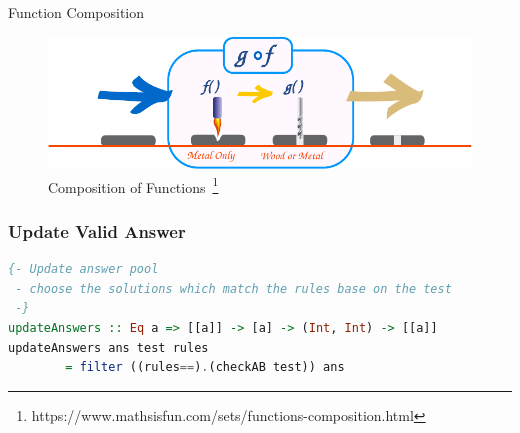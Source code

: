 \documentclass[10pt]{beamer}
\begin{document}
\begin{frame}{Function Composition}
  \begin{figure}
  \includegraphics[width=\textwidth,keepaspectratio] {function-composition-c.pdf}
    \caption{Composition of Functions~\footnote{https://www.mathsisfun.com/sets/functions-composition.html}}
  \end{figure}
  
\end{frame}


\begin{frame}[fragile]
\frametitle{Update Valid Answer}
    
     \begin{lstlisting}[language=Haskell,numbers=none]
{- Update answer pool
 - choose the solutions which match the rules base on the test
 -}
updateAnswers :: Eq a => [[a]] -> [a] -> (Int, Int) -> [[a]]
updateAnswers ans test rules
        = filter ((rules==).(checkAB test)) ans
    \end{lstlisting}
\end{frame}



\end{document}
